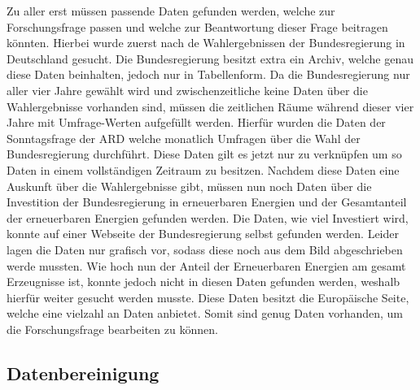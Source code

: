 \documentclass[12pt]{article}
\begin{document}
Zu aller erst müssen passende Daten gefunden werden, welche zur Forschungsfrage passen und welche zur Beantwortung dieser Frage beitragen könnten. Hierbei wurde zuerst nach de Wahlergebnissen der Bundesregierung in Deutschland gesucht. Die Bundesregierung besitzt extra ein Archiv, welche genau diese Daten beinhalten, jedoch nur in Tabellenform. Da die Bundesregierung nur aller vier Jahre gewählt wird und zwischenzeitliche keine Daten über die Wahlergebnisse vorhanden sind, müssen die zeitlichen Räume während dieser vier Jahre mit Umfrage-Werten aufgefüllt werden. Hierfür wurden die Daten der Sonntagsfrage der ARD welche monatlich Umfragen über die Wahl der Bundesregierung durchführt. Diese Daten gilt es jetzt nur zu verknüpfen um so Daten in einem vollständigen Zeitraum zu besitzen. Nachdem diese Daten eine Auskunft über die Wahlergebnisse gibt, müssen nun noch Daten über die Investition der Bundesregierung in erneuerbaren Energien und der Gesamtanteil der erneuerbaren Energien gefunden werden. Die Daten, wie viel Investiert wird, konnte auf einer Webseite der Bundesregierung selbst gefunden werden. Leider lagen die Daten nur grafisch vor, sodass diese noch aus dem Bild abgeschrieben werde mussten. Wie hoch nun der Anteil der Erneuerbaren Energien am gesamt Erzeugnisse ist, konnte jedoch nicht in diesen Daten gefunden werden, weshalb hierfür weiter gesucht werden musste. Diese Daten besitzt die Europäische Seite, welche eine vielzahl an Daten anbietet. Somit sind genug Daten vorhanden, um die Forschungsfrage bearbeiten zu können.
        
        \subsection{Datenbereinigung}
        
\end{document}
